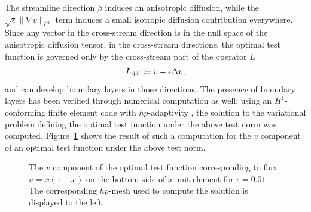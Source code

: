 \documentclass[11pt,onecolumn]{scrartcl}
\newcommand{\grad}{\nabla}
\begin{document}
The streamline direction $\beta$ induces an anisotropic diffusion, while the $\sqrt{\epsilon}\|\grad v\|_{L^2}$ term induces a small isotropic diffusion contribution everywhere. Since any vector in the cross-stream direction is in the null space of the anisotropic diffusion tensor, in the cross-stream directions, the optimal test function is governed only by the cross-stream part of the operator $L$
\[
L_{\rm \beta^\perp} \coloneqq v - \epsilon \Delta v,
\]
and can develop boundary layers in those directions. The presence of boundary layers has been verified through numerical computation as well; using an $H^1$-conforming finite element code with $hp$-adaptivity \cite{demkowicz2006computing}, the solution to the variational problem defining the optimal test function under the above test norm was computed. Figure~\ref{fig:boundaryTest} shows the result of such a computation for the $v$ component of an optimal test function under the above test norm. 
\begin{figure}[!h]
\centering
{}
\caption{The $v$ component of the optimal test function corresponding to flux $\widehat{u} = x(1-x)$ on the bottom side of a unit element for $\epsilon = 0.01$. The corresponding $hp$-mesh used to compute the solution is displayed to the left.}
\label{fig:boundaryTest}
\end{figure}
\end{document}
